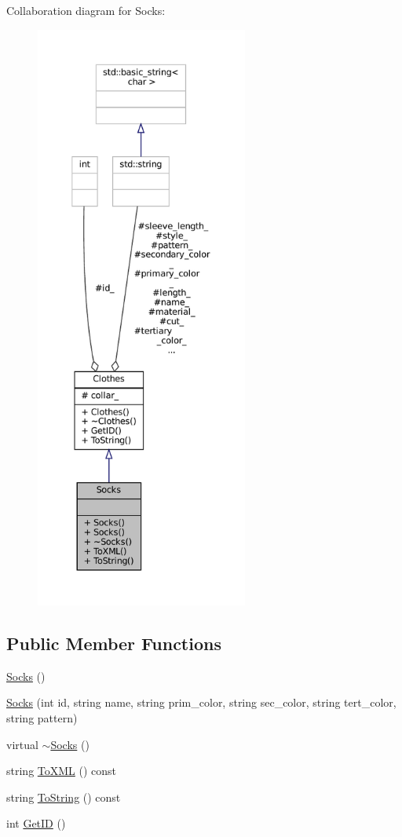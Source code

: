 Collaboration diagram for Socks\+:\nopagebreak
\begin{figure}[H]
\begin{center}
\leavevmode
\includegraphics[height=550pt]{classSocks__coll__graph}
\end{center}
\end{figure}
\subsection*{Public Member Functions}
\begin{DoxyCompactItemize}
\item 
\mbox{\hyperlink{classSocks_a5357afba0ba13b32e1d417bdb7059c68}{Socks}} ()
\item 
\mbox{\hyperlink{classSocks_ab8f83e88b6131bbf22d75de7a41d241a}{Socks}} (int id, string name, string prim\+\_\+color, string sec\+\_\+color, string tert\+\_\+color, string pattern)
\item 
virtual \mbox{\hyperlink{classSocks_a1791f54f1b29487892245c80cbe7c50b}{$\sim$\+Socks}} ()
\item 
string \mbox{\hyperlink{classSocks_a5ecf1671277183b60f8eea7020cf32ed}{To\+X\+ML}} () const
\item 
string \mbox{\hyperlink{classSocks_aad237fbcc4ccf36a2956fcdef8760683}{To\+String}} () const
\item 
int \mbox{\hyperlink{classClothes_a3f6dac172f333126d19010f85ec44e4c}{Get\+ID}} ()
\end{DoxyCompactItemize}
